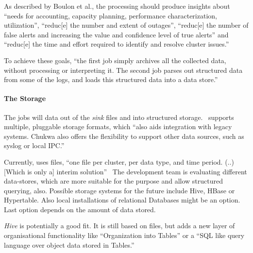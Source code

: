 As described by Boulon et al., the \mr processing should produce insights about ``needs for accounting, capacity planning, performance characterization, utilization'', ``reduc[e] the number and extent of outages'', ``reduc[e] the number of false alerts and increasing the value and confidence level of true alerts'' and ``reduc[e] the time and effort required to identify and resolve cluster issues.''\cite{Boulonb}

To achieve these goals, ``the first job simply archives all the collected data, without processing or interpreting it. The second job parses out structured data from some of the logs, and loads this structured data into a data store.''~\cite{Boulona} 


\paragraph{The Storage}

The \mr jobs will \demux data out of the \textit{sink} files and into structured storage.~\cite{Boulonb} 
\chuk supports multiple, pluggable storage formats, which ``also aids integration with legacy systems. Chukwa also offers the flexibility to support other data sources, such as syslog or local IPC.''~\cite{Rabkin2010a} 

Currently, \chuk uses \hdfs files, ``one file per cluster, per data type, and time period. (..) [Which is only a] interim solution''~\cite{Boulona} 
The development team is evaluating different data-stores, which are more suitable for the purpose and allow structured querying, also.
Possible storage systems for the future include Hive, HBase or Hypertable. Also local installations of relational Databases might be an option.~\cite{Boulonb} Last option depends on the amount of data stored.

\textit{Hive} is potentially a good fit. It is still based on \hdfs files, but adds a new layer of organisational functionality like ``Organization into Tables'' or a ``SQL like query language over object data stored in Tables.''~\cite{Sarma08}